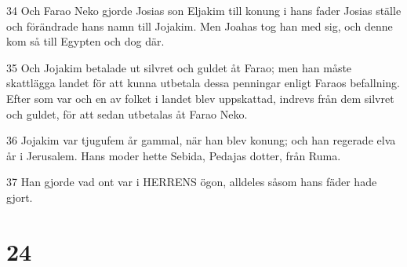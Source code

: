 \par 34 Och Farao Neko gjorde Josias son Eljakim till konung i hans fader Josias ställe och förändrade hans namn till Jojakim. Men Joahas tog han med sig, och denne kom så till Egypten och dog där.
\par 35 Och Jojakim betalade ut silvret och guldet åt Farao; men han måste skattlägga landet för att kunna utbetala dessa penningar enligt Faraos befallning. Efter som var och en av folket i landet blev uppskattad, indrevs från dem silvret och guldet, för att sedan utbetalas åt Farao Neko.
\par 36 Jojakim var tjugufem år gammal, när han blev konung; och han regerade elva år i Jerusalem. Hans moder hette Sebida, Pedajas dotter, från Ruma.
\par 37 Han gjorde vad ont var i HERRENS ögon, alldeles såsom hans fäder hade gjort.

\chapter{24}

